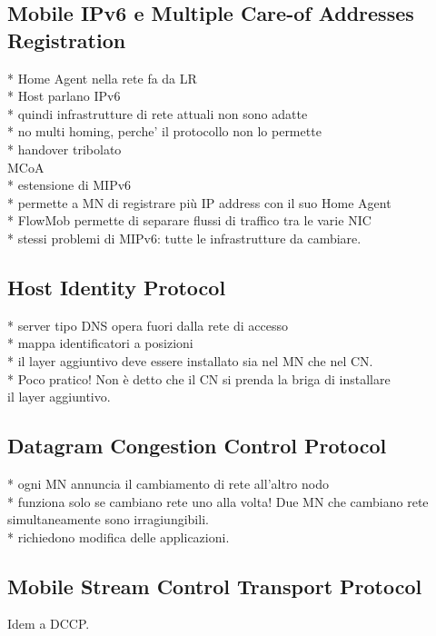 \documentclass[12pt,a4paper,openright,twoside]{book}
\begin{document}
\subsection{Mobile IPv6 e Multiple Care-of Addresses Registration}
* Home Agent nella rete fa da LR\\
* Host parlano IPv6\\
* quindi infrastrutture di rete attuali non sono adatte\\
* no multi homing, perche' il protocollo non lo permette\\
* handover tribolato\\
MCoA\\
* estensione di MIPv6\\
* permette a MN di registrare più IP address con il suo Home Agent\\
* FlowMob permette di separare flussi di traffico tra le varie NIC\\
* stessi problemi di MIPv6: tutte le infrastrutture da cambiare.

\subsection{Host Identity Protocol}
* server tipo DNS opera fuori dalla rete di accesso\\
* mappa identificatori a posizioni\\
* il layer aggiuntivo deve essere installato sia nel MN che nel
  CN.\\
* Poco pratico! Non è detto che il CN si prenda la briga di installare\\
  il layer aggiuntivo.\\

\subsection{Datagram Congestion Control Protocol}
* ogni MN annuncia il cambiamento di rete all'altro nodo\\
* funziona solo se cambiano rete uno alla volta! Due MN che cambiano
  rete simultaneamente sono irragiungibili.\\
* richiedono modifica delle applicazioni.\\

\subsection{Mobile Stream Control Transport Protocol}
Idem a DCCP.
\end{document}
